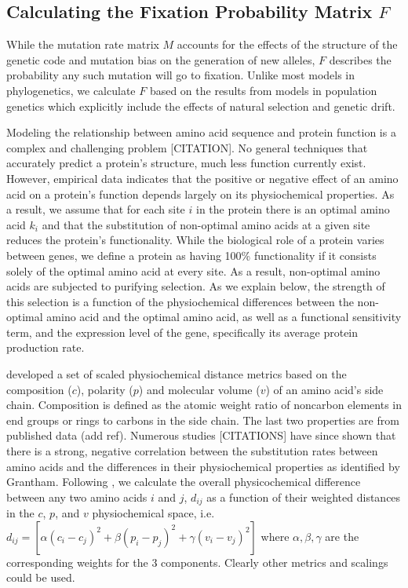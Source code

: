 \documentclass[13pt]{article}
\begin{document}
\subsection*{Calculating the Fixation Probability Matrix $F$}
While the mutation rate matrix $M$ accounts for the effects of the structure of the genetic code and mutation bias on the generation of new alleles,  $F$ describes the probability any such mutation will go to fixation.
Unlike most models in phylogenetics, we calculate $F$ based on the results from models in population genetics which explicitly include the effects of natural selection and genetic drift. 


Modeling the relationship between amino acid sequence and protein function is a complex and challenging problem [CITATION].
No general techniques that accurately predict a protein's structure, much less function currently exist.
However, empirical data indicates that the positive or negative effect of an amino acid on a protein's function depends largely on its physiochemical properties.
As a result, we assume that for each site $i$ in the protein there is an optimal amino acid $k_i$ and that the substitution of non-optimal amino acids at a given site reduces the protein's functionality.
While the biological role of a protein varies between genes, we define a protein as having 100\% functionality if it consists solely of the optimal amino acid at every site.
As a result, non-optimal amino acids are subjected to purifying selection.
As we explain below, the strength of this selection is a function of the physiochemical differences between the non-optimal amino acid and the optimal amino acid, as well as a functional sensitivity term, and the expression level of the gene, specifically its average protein production rate.


\citet{Grantham74} developed a set of scaled physiochemical distance metrics based on the composition ($c$), polarity ($p$) and molecular volume ($v$) of an amino acid's side chain.
Composition is defined as the atomic weight ratio of noncarbon elements in end groups or rings to carbons in the side chain.
The last two properties are from published data (add ref).
Numerous studies [CITATIONS] have since shown that there is a strong, negative correlation between the substitution rates between amino acids and the differences in their physiochemical properties as identified by Grantham.
Following \citet{Grantham74}, we calculate the overall physicochemical difference between any two amino acids $i$ and $j$, $d_{ij}$ as a function of their weighted distances in the $c$, $p$, and $v$ physiochemical space, i.e. $d_{ij} = [\alpha (c_i-c_j)^2 + \beta (p_i - p_j)^2 + \gamma (v_i - v_j)^2]$ where $\alpha, \beta, \gamma$ are the corresponding weights for the 3 components.
Clearly other metrics and scalings could be used.
\end{document}
